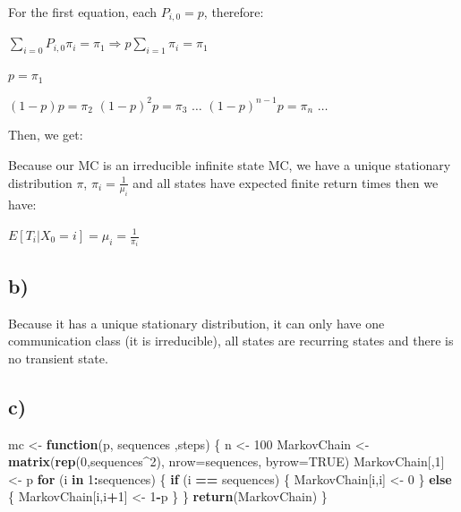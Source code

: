 \documentclass[]{article}
\newenvironment{Shaded}{\begin{snugshade}}{\end{snugshade}}
\newcommand{\ControlFlowTok}[1]{\textcolor[rgb]{0.13,0.29,0.53}{\textbf{#1}}}
\newcommand{\DataTypeTok}[1]{\textcolor[rgb]{0.13,0.29,0.53}{#1}}
\newcommand{\DecValTok}[1]{\textcolor[rgb]{0.00,0.00,0.81}{#1}}
\newcommand{\KeywordTok}[1]{\textcolor[rgb]{0.13,0.29,0.53}{\textbf{#1}}}
\newcommand{\NormalTok}[1]{#1}
\newcommand{\OperatorTok}[1]{\textcolor[rgb]{0.81,0.36,0.00}{\textbf{#1}}}
\newcommand{\OtherTok}[1]{\textcolor[rgb]{0.56,0.35,0.01}{#1}}
\newcommand{\StringTok}[1]{\textcolor[rgb]{0.31,0.60,0.02}{#1}}
\begin{document}
For the first equation, each \(P_{i,0} = p\), therefore:

\(\sum_{i=0} P_{i,0} \pi_{i} = \pi_{1} \Rightarrow p \sum_{i=1} \pi_{i} = \pi_{1}\)

\(p = \pi_{1}\)

\((1 - p)p = \pi_{2}\) \((1 - p)^{2} p = \pi_{3}\) \(\dots\)
\((1 - p)^{n-1} p = \pi_{n}\) \(\dots\)

Then, we get:

Because our MC is an irreducible infinite state MC, we have a unique
stationary distribution \(\pi\), \(\pi_{i} = \frac{1}{\mu_{i}}\) and all
states have expected finite return times then we have:

\(E[T_{i}|X_{0} = i] = \mu_{i} = \frac{1}{\pi_{i}}\)

\hypertarget{b-1}{%
\subsection{b)}\label{b-1}}

Because it has a unique stationary distribution, it can only have one
communication class (it is irreducible), all states are recurring states
and there is no transient state.

\hypertarget{c-1}{%
\subsection{c)}\label{c-1}}

\begin{Shaded}
\begin{Highlighting}[]
\NormalTok{mc <-}\StringTok{ }\ControlFlowTok{function}\NormalTok{(p, sequences ,steps) \{}
\NormalTok{    n <-}\StringTok{ }\DecValTok{100}
\NormalTok{    MarkovChain <-}\StringTok{ }\KeywordTok{matrix}\NormalTok{(}\KeywordTok{rep}\NormalTok{(}\DecValTok{0}\NormalTok{,sequences}\OperatorTok{^}\DecValTok{2}\NormalTok{), }\DataTypeTok{nrow=}\NormalTok{sequences, }\DataTypeTok{byrow=}\OtherTok{TRUE}\NormalTok{)}
\NormalTok{    MarkovChain[,}\DecValTok{1}\NormalTok{] <-}\StringTok{ }\NormalTok{p}
    \ControlFlowTok{for}\NormalTok{ (i }\ControlFlowTok{in} \DecValTok{1}\OperatorTok{:}\NormalTok{sequences) \{}
        \ControlFlowTok{if}\NormalTok{ (i }\OperatorTok{==}\StringTok{ }\NormalTok{sequences) \{}
\NormalTok{            MarkovChain[i,i] <-}\StringTok{ }\DecValTok{0}
\NormalTok{        \} }\ControlFlowTok{else}\NormalTok{ \{}
\NormalTok{            MarkovChain[i,i}\OperatorTok{+}\DecValTok{1}\NormalTok{] <-}\StringTok{ }\DecValTok{1}\OperatorTok{-}\NormalTok{p}
\NormalTok{        \}}
\NormalTok{    \}}
    \KeywordTok{return}\NormalTok{(MarkovChain)}
\NormalTok{\}}
\end{Highlighting}
\end{Shaded}
\end{document}
